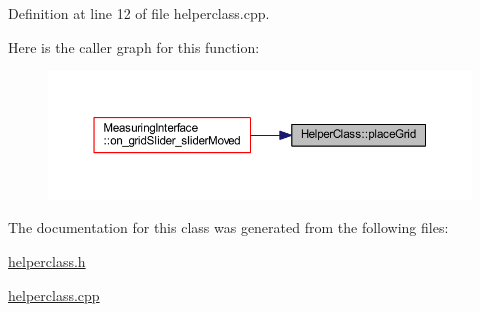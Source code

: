 Definition at line 12 of file helperclass.\+cpp.

Here is the caller graph for this function\+:
\nopagebreak
\begin{figure}[H]
\begin{center}
\leavevmode
\includegraphics[width=350pt]{classHelperClass_a2628c0f86fb5959325f6aa4272b6f210_icgraph}
\end{center}
\end{figure}


The documentation for this class was generated from the following files\+:\begin{DoxyCompactItemize}
\item 
\mbox{\hyperlink{helperclass_8h}{helperclass.\+h}}\item 
\mbox{\hyperlink{helperclass_8cpp}{helperclass.\+cpp}}\end{DoxyCompactItemize}
